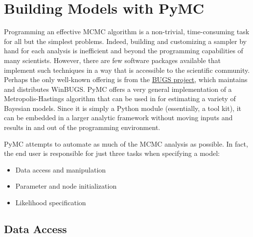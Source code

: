 \documentclass[]{book}
\begin{document}
\chapter{Building Models with PyMC}

Programming an effective MCMC algorithm is a non-trivial, time-consuming task for all but the simplest problems. Indeed, building and customizing a sampler by hand for each analysis is inefficient and beyond the programming capabilities of many scientists. However, there are few software packages available that implement such techniques in a way that is accessible to the scientific community. Perhaps the only well-known offering is from the \href{http://www.mrc-bsu.cam.ac.uk/bugs/}{BUGS project}, which maintains and distributes WinBUGS. PyMC offers a very general implementation of a Metropolis-Hastings algorithm that can be used in for estimating a variety of Bayesian models. Since it is simply a Python module (essentially, a tool kit), it can be embedded in a larger analytic framework without moving inputs and results in and out of the programming environment.

PyMC attempts to automate as much of the MCMC analysis as possible. In fact, the end user is responsible for just three tasks when specifying a model:
\begin{itemize}

    \item Data access and manipulation

    \item Parameter and node initialization

    \item Likelihood specification

\end{itemize}

\section{Data Access}\label{sec:data_access}
\end{document}
